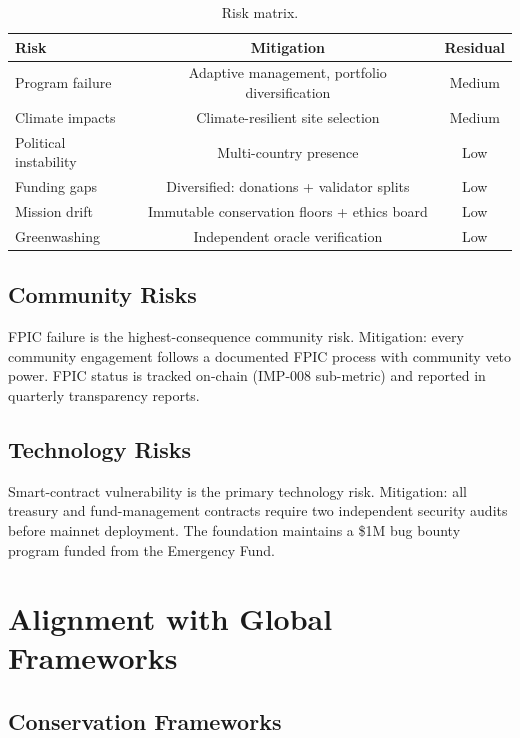 \documentclass[11pt,letterpaper]{article}
\begin{document}
\begin{table}[t]
\centering
\begin{tabular}{lcc}
\toprule
\textbf{Risk} & \textbf{Mitigation} & \textbf{Residual} \\
\midrule
Program failure & Adaptive management, portfolio diversification & Medium \\
Climate impacts & Climate-resilient site selection & Medium \\
Political instability & Multi-country presence & Low \\
Funding gaps & Diversified: donations + validator splits & Low \\
Mission drift & Immutable conservation floors + ethics board & Low \\
Greenwashing & Independent oracle verification & Low \\
\bottomrule
\end{tabular}
\caption{Risk matrix.}
\label{tab:risks}
\end{table}

\subsection{Community Risks}

FPIC failure is the highest-consequence community risk. Mitigation: every community engagement follows a documented FPIC process with community veto power. FPIC status is tracked on-chain (IMP-008 sub-metric) and reported in quarterly transparency reports.

\subsection{Technology Risks}

Smart-contract vulnerability is the primary technology risk. Mitigation: all treasury and fund-management contracts require two independent security audits before mainnet deployment. The foundation maintains a \$1M bug bounty program funded from the Emergency Fund.

\section{Alignment with Global Frameworks}

\subsection{Conservation Frameworks}
\end{document}
